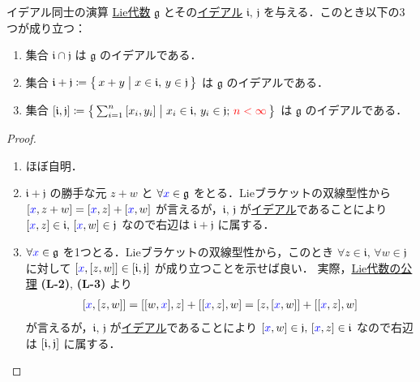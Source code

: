 \documentclass[rep_main]{subfiles}
\begin{document}
\begin{mylem}[label=lem:ideal-LieAlg]{イデアル同士の演算}
    \hyperref[ax:LieAlg]{Lie代数} $\mathfrak{g}$ とその\hyperref[def:ideal-LieAlg]{イデアル} $\mathfrak{i},\, \mathfrak{j}$ を与える．このとき以下の3つが成り立つ：
    \begin{enumerate}
        \item 集合 $\mathfrak{i} \cap \mathfrak{j}$ は $\mathfrak{g}$ のイデアルである．
        \item 集合 $\mathfrak{i} + \mathfrak{j} \coloneqq \bigl\{\, x + y \bigm| x \in \mathfrak{i},\, y \in \mathfrak{j} \,\bigr\}$ は $\mathfrak{g}$ のイデアルである．
        \item 集合 $\comm{\mathfrak{i}}{\mathfrak{j}} \coloneqq \bigl\{\, \sum_{i=1}^n \comm{x_i}{y_i} \bigm| x_i \in \mathfrak{i},\, y_i \in \mathfrak{j};\, \textcolor{red}{n < \infty} \,\bigr\}$ は $\mathfrak{g}$ のイデアルである．
    \end{enumerate}
\end{mylem}

\begin{proof}
    \begin{enumerate}
        \item ほぼ自明．
        \item $\mathfrak{i} + \mathfrak{j}$ の勝手な元 $z + w$ と $\forall \textcolor{blue}{x} \in \mathfrak{g}$ をとる．Lieブラケットの双線型性から $\comm{\textcolor{blue}{x}}{z + w} = \comm{\textcolor{blue}{x}}{z} + \comm{\textcolor{blue}{x}}{w}$ が言えるが，$\mathfrak{i},\, \mathfrak{j}$ が\hyperref[def:ideal-LieAlg]{イデアル}であることにより $\comm{\textcolor{blue}{x}}{z} \in \mathfrak{i},\, \comm{\textcolor{blue}{x}}{w} \in \mathfrak{j}$ なので右辺は $\mathfrak{i} + \mathfrak{j}$ に属する．
        \item $\forall \textcolor{blue}{x} \in \mathfrak{g}$ を1つとる．Lieブラケットの双線型性から，このとき $\forall z \in \mathfrak{i},\, \forall w \in \mathfrak{j}$ に対して $\comm{\textcolor{blue}{x}}{\comm{z}{w}} \in \comm{\mathfrak{i}}{\mathfrak{j}}$ が成り立つことを示せば良い．
        実際，\hyperref[ax:LieAlg]{Lie代数の公理} \textsf{\textbf{(L-2)}}, \textsf{\textbf{(L-3)}} より
        \begin{align}
            \comm{\textcolor{blue}{x}}{\comm{z}{w}} = \comm{\comm{w}{\textcolor{blue}{x}}}{z} + \comm{\comm{\textcolor{blue}{x}}{z}}{w} = \comm{z}{\comm{\textcolor{blue}{x}}{w}} + \comm{\comm{\textcolor{blue}{x}}{z}}{w}
        \end{align}
        が言えるが，$\mathfrak{i},\, \mathfrak{j}$ が\hyperref[def:ideal-LieAlg]{イデアル}であることにより $\comm{\textcolor{blue}{x}}{w} \in \mathfrak{j},\, \comm{\textcolor{blue}{x}}{z} \in \mathfrak{i}$ なので右辺は $\comm{\mathfrak{i}}{\mathfrak{j}}$ に属する．
    \end{enumerate}
    
\end{proof}
\end{document}
